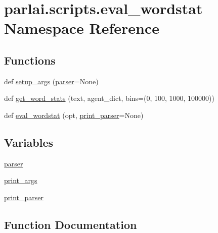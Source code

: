 \hypertarget{namespaceparlai_1_1scripts_1_1eval__wordstat}{}\section{parlai.\+scripts.\+eval\+\_\+wordstat Namespace Reference}
\label{namespaceparlai_1_1scripts_1_1eval__wordstat}
\subsection*{Functions}
\begin{DoxyCompactItemize}
\item 
def \hyperlink{namespaceparlai_1_1scripts_1_1eval__wordstat_af41cd95533433b93e7383bc6dab04963}{setup\+\_\+args} (\hyperlink{namespaceparlai_1_1scripts_1_1eval__wordstat_ac40c7c216653465e991454ad0f2f7925}{parser}=None)
\item 
def \hyperlink{namespaceparlai_1_1scripts_1_1eval__wordstat_ab2d96b5ac07c988934a0320739fc3c60}{get\+\_\+word\+\_\+stats} (text, agent\+\_\+dict, bins=(0, 100, 1000, 100000))
\item 
def \hyperlink{namespaceparlai_1_1scripts_1_1eval__wordstat_abdad0c3df5ffa1768c0d5822d3668ba0}{eval\+\_\+wordstat} (opt, \hyperlink{namespaceparlai_1_1scripts_1_1eval__wordstat_a3425702146738eb147346873ecda1983}{print\+\_\+parser}=None)
\end{DoxyCompactItemize}
\subsection*{Variables}
\begin{DoxyCompactItemize}
\item 
\hyperlink{namespaceparlai_1_1scripts_1_1eval__wordstat_ac40c7c216653465e991454ad0f2f7925}{parser}
\item 
\hyperlink{namespaceparlai_1_1scripts_1_1eval__wordstat_a743654c019524601e6d80586405ade64}{print\+\_\+args}
\item 
\hyperlink{namespaceparlai_1_1scripts_1_1eval__wordstat_a3425702146738eb147346873ecda1983}{print\+\_\+parser}
\end{DoxyCompactItemize}


\subsection{Function Documentation}
\mbox{\label{namespaceparlai_1_1scripts_1_1eval__wordstat_abdad0c3df5ffa1768c0d5822d3668ba0}} 

